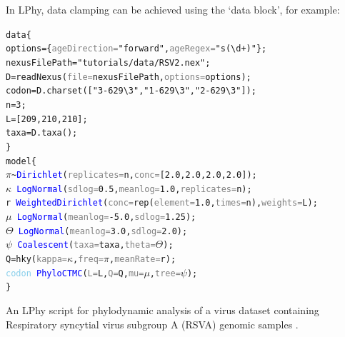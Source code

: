 \documentclass[10pt,letterpaper,table]{article}
\theoremstyle{definition}
\begin{document}
In LPhy, data clamping can be achieved using the `data block', for example:

{
  \small
  \begin{example}
    \begin{alltt}
      data \{
      \quad options = \{\textcolor{gray}{ageDirection=}\textcolor{constant}{"forward"}, \textcolor{gray}{ageRegex=}\textcolor{constant}{"s(\textbackslash{}d+)"}\};
      \quad nexusFilePath = \textcolor{constant}{"tutorials/data/RSV2.nex"};
      \quad D = \textcolor{generator}{readNexus}(\textcolor{gray}{file=}nexusFilePath, \textcolor{gray}{options=}options);
      \quad codon = D.\textcolor{generator}{charset}([\textcolor{constant}{"3-629\textbackslash{}3"}, \textcolor{constant}{"1-629\textbackslash{}3"}, \textcolor{constant}{"2-629\textbackslash{}3"}]);
      \quad n = \textcolor{constant}{3};
      \quad L = [\textcolor{constant}{209}, \textcolor{constant}{210}, \textcolor{constant}{210}];
      \quad taxa = D.\textcolor{generator}{taxa}();
      \}
      model \{
      \quad \textcolor{bluishgreen}{\(\pi\)} \textasciitilde \textcolor{blue}{Dirichlet}(\textcolor{gray}{replicates=}n, \textcolor{gray}{conc=}[\textcolor{constant}{2.0}, \textcolor{constant}{2.0}, \textcolor{constant}{2.0}, \textcolor{constant}{2.0}]);
      \quad \textcolor{bluishgreen}{\(\kappa\)} ~ \textcolor{blue}{LogNormal}(\textcolor{gray}{sdlog=}\textcolor{constant}{0.5}, \textcolor{gray}{meanlog=}\textcolor{constant}{1.0}, \textcolor{gray}{replicates=}n);
      \quad \textcolor{bluishgreen}{r} ~ \textcolor{blue}{WeightedDirichlet}(\textcolor{gray}{conc=}\textcolor{generator}{rep}(\textcolor{gray}{element=}\textcolor{constant}{1.0}, \textcolor{gray}{times=}n), \textcolor{gray}{weights=}L);
      \quad \textcolor{bluishgreen}{\(\mu\)} ~ \textcolor{blue}{LogNormal}(\textcolor{gray}{meanlog=}\textcolor{constant}{-5.0}, \textcolor{gray}{sdlog=}\textcolor{constant}{1.25});
      \quad \textcolor{bluishgreen}{\(\Theta\)} ~ \textcolor{blue}{LogNormal}(\textcolor{gray}{meanlog=}\textcolor{constant}{3.0}, \textcolor{gray}{sdlog=}\textcolor{constant}{2.0});
      \quad \textcolor{bluishgreen}{\(\psi\)} ~ \textcolor{blue}{Coalescent}(\textcolor{gray}{taxa=}taxa, \textcolor{gray}{theta=}\textcolor{bluishgreen}{\(\Theta\)});
      \quad Q = \textcolor{generator}{hky}(\textcolor{gray}{kappa=}\textcolor{bluishgreen}{\(\kappa\)}, \textcolor{gray}{freq=}\textcolor{bluishgreen}{\(\pi\)}, \textcolor{gray}{meanRate=}\textcolor{bluishgreen}{r});
      \quad \textcolor{skyblue}{codon} ~ \textcolor{blue}{PhyloCTMC}(\textcolor{gray}{L=}L, \textcolor{gray}{Q=}Q, \textcolor{gray}{mu=}\textcolor{bluishgreen}{\(\mu\)}, \textcolor{gray}{tree=}\textcolor{bluishgreen}{\(\psi\)});
      \}
    \end{alltt}
    \caption{An LPhy script for phylodynamic analysis of a virus dataset containing Respiratory syncytial virus subgroup A (RSVA) genomic samples \cite{zlateva2004molecular, zlateva2005genetic}.
    \newline}
    \label{lphy:rsva}
  \end{example}
}
\end{document}

